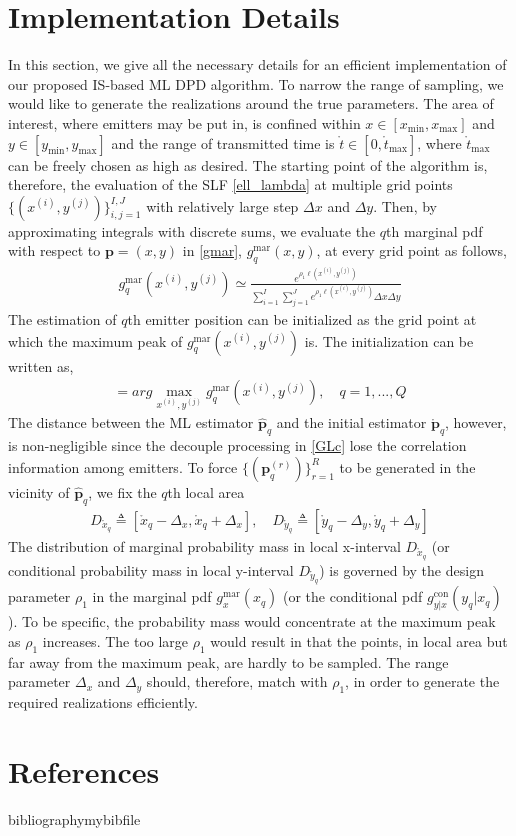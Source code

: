 \documentclass[review]{elsarticle}
\begin{document}
\section{Implementation Details}
In this section, we give all the necessary details for an efficient implementation of our proposed IS-based ML DPD algorithm. To narrow the range of sampling, we would like to generate the realizations around the true parameters. The area of interest, where emitters may be put in, is confined within $x\in [x_{\text{min}},x_{\text{max}}]$ and $y\in [y_{\text{min}},y_{\text{max}}]$ and the range of transmitted time is $\mathring{t}\in [0,\mathring{t}_{\text{max}}]$, where $\mathring{t}_{\text{max}}$ can be freely chosen as high as desired. The starting point of the algorithm is, therefore, the evaluation of the SLF \eqref{ell_lambda} at multiple grid points $\lbrace(x^{(i)},y^{(j)})\rbrace_{i,j=1}^{I,J}$ with relatively large step $\Delta x$ and $\Delta y$. Then, by approximating integrals with discrete sums, we evaluate the $q$th marginal pdf with respect to $\boldsymbol{p}=(x,y)$ in \eqref{gmar}, $g_{q}^{\text{mar}}(x,y)$, at every grid point as follows, 
\begin{align}
    g_{q}^{\text{mar}}(x^{(i)},y^{(j)})\simeq\frac{e^{\rho_1\ell (x^{(i)},y^{(j)})}}{\sum_{i=1}^I\sum_{j=1}^Je^{\rho_1\ell (x^{(i)},y^{(j)})}\Delta x\Delta y}
\end{align}
The estimation of $q$th emitter position can be initialized as the grid point at which the maximum peak of $g_{q}^{\text{mar}}(x^{(i)},y^{(j)})$ is. The initialization can be written as,
\begin{align}
    [\mathring{x}_q,\mathring{y}_q]=arg \max_{x^{(i)},y^{(j)}} g_{q}^{\text{mar}}(x^{(i)},y^{(j)}),\quad q=1,...,Q
\end{align}
The distance between the ML estimator $\hat{\boldsymbol{p}}_q$ and the initial estimator $\mathring{\boldsymbol{p}}_q$, however, is non-negligible since the decouple processing in \eqref{GLc} lose the correlation information among emitters. To force $\lbrace(\boldsymbol{p}_q^{(r)})\rbrace_{r=1}^{R}$ to be generated in the vicinity of $\hat{\boldsymbol{p}}_q$, we fix the $q$th local area
\begin{align}
    D_{\mathring{x}_q}\triangleq[\mathring{x}_q-\Delta_x,\mathring{x}_q+\Delta_x],\quad D_{\mathring{y}_q}\triangleq[\mathring{y}_q-\Delta_y,\mathring{y}_q+\Delta_y]
\end{align}
The distribution of marginal probability mass in local x-interval $D_{\mathring{x}_q}$ (or conditional probability mass in local y-interval $D_{\mathring{y}_q}$) is governed by the design parameter $\rho_1$ in the marginal pdf $g_{x}^{\text{mar}}(x_q)$ (or the conditional pdf $g_{y\vert x}^{\text{con}}(y_q\vert x_q)$ ). To be specific, the probability mass would concentrate at the maximum peak as $\rho_1$ increases. The too large $\rho_1$ would result in that the points, in local area but far away from the maximum peak, are hardly to be sampled. The range parameter $\Delta_x$ and $\Delta_y$ should, therefore, match with $\rho_1$, in order to generate the required realizations efficiently.

\section*{References}
bibliography{mybibfile}
\end{document}
